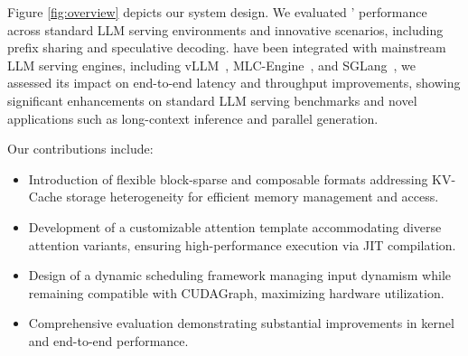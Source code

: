 Figure \ref{fig:overview} depicts our system design. We evaluated \sys' performance across standard LLM serving environments and innovative scenarios, including prefix sharing and speculative decoding. \sys have been integrated with mainstream LLM serving engines, including vLLM~\cite{kwon2023vllm}, MLC-Engine~\cite{mlcllm, lai2023relax}, and SGLang~\cite{zheng2023sglang}, we assessed its impact on end-to-end latency and throughput improvements, showing significant enhancements on standard LLM serving benchmarks and novel applications such as long-context inference and parallel generation.

Our contributions include:
\begin{itemize}[itemsep=0pt,topsep=0pt,parsep=0pt]
    \item Introduction of flexible block-sparse and composable formats addressing KV-Cache storage heterogeneity for efficient memory management and access.
    \item Development of a customizable attention template accommodating diverse attention variants, ensuring high-performance execution via JIT compilation.
    \item Design of a dynamic scheduling framework managing input dynamism while remaining compatible with CUDAGraph, maximizing hardware utilization.
    \item Comprehensive evaluation demonstrating substantial improvements in kernel and end-to-end performance.
\end{itemize}
\vspace{-1em}